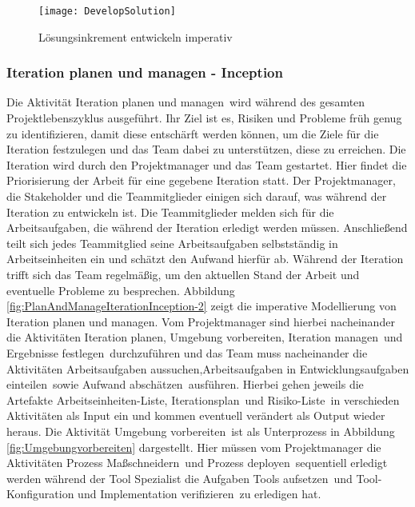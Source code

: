  
\begin{figure}[htp]
\begin{center}
  \texttt{[image: DevelopSolution]} %
  \caption{Lösungsinkrement entwickeln imperativ}
  \label{fig:Dev}
\end{center}
\end{figure}

\subsubsection{Iteration planen und managen - Inception}

Die Aktivität \grqq Iteration planen und managen\grqq \ wird während des gesamten Projektlebenszyklus ausgeführt. Ihr Ziel ist es, Risiken und Probleme früh genug zu identifizieren, damit diese entschärft werden können, um die Ziele für die Iteration festzulegen und das Team dabei zu unterstützen, diese zu erreichen.
Die Iteration wird durch den Projektmanager und das Team gestartet. Hier findet die Priorisierung der Arbeit für eine gegebene Iteration statt. Der Projektmanager, die Stakeholder und die Teammitglieder einigen sich darauf, was während der Iteration zu entwickeln ist.
Die Teammitglieder melden sich für die Arbeitsaufgaben, die während der Iteration erledigt werden müssen. Anschließend teilt sich jedes Teammitglied seine Arbeitsaufgaben selbstständig in Arbeitseinheiten ein und schätzt den Aufwand hierfür ab.\newline
Während der Iteration trifft sich das Team regelmäßig, um den aktuellen Stand der Arbeit und eventuelle Probleme zu besprechen. \newline
Abbildung \ref{fig:PlanAndManageIterationInception-2} zeigt die imperative Modellierung von \grqq Iteration planen und managen\grqq. 
Vom Projektmanager sind hierbei nacheinander die Aktivitäten \grqq Iteration planen\grqq, \grqq Umgebung vorbereiten\grqq, \grqq Iteration managen\grqq \ und \grqq Ergebnisse festlegen\grqq \ durchzuführen und das Team muss nacheinander die Aktivitäten \grqq Arbeitsaufgaben aussuchen\grqq,\grqq Arbeitsaufgaben in Entwicklungsaufgaben einteilen\grqq \ sowie \grqq Aufwand abschätzen\grqq \ ausführen. Hierbei gehen jeweils die Artefakte \grqq Arbeitseinheiten-Liste, Iterationsplan\grqq \ und \grqq Risiko-Liste\grqq \ in verschieden Aktivitäten als Input ein und kommen eventuell verändert als Output wieder heraus. \newline
Die Aktivität \grqq Umgebung vorbereiten\grqq \ ist als Unterprozess in Abbildung \ref{fig:Umgebungvorbereiten} dargestellt. Hier müssen vom Projektmanager die Aktivitäten \grqq Prozess Maßschneidern\grqq \ und \grqq Prozess deployen\grqq \ sequentiell erledigt werden während der Tool Spezialist die Aufgaben \grqq Tools aufsetzen\grqq \ und \grqq Tool-Konfiguration und Implementation verifizieren\grqq \ zu erledigen hat.


